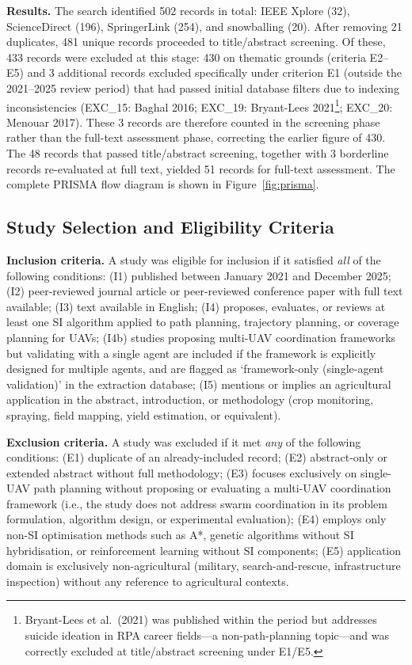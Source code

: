 \documentclass[review,3p,times]{elsarticle}
\begin{document}
\textbf{Results.} The search identified 502 records in total: IEEE Xplore (32), ScienceDirect (196), SpringerLink (254), and snowballing (20). After removing 21 duplicates, 481 unique records proceeded to title/abstract screening. Of these, 433 records were excluded at this stage: 430 on thematic grounds (criteria E2--E5) and 3 additional records excluded specifically under criterion E1 (outside the 2021--2025 review period) that had passed initial database filters due to indexing inconsistencies (EXC\_15: Baghal 2016; EXC\_19: Bryant-Lees 2021\footnote{Bryant-Lees et al.\ (2021) was published within the period but addresses suicide ideation in RPA career fields---a non-path-planning topic---and was correctly excluded at title/abstract screening under E1/E5.}; EXC\_20: Menouar 2017). These 3 records are therefore counted in the screening phase rather than the full-text assessment phase, correcting the earlier figure of 430. The 48 records that passed title/abstract screening, together with 3 borderline records re-evaluated at full text, yielded 51 records for full-text assessment. The complete PRISMA flow diagram is shown in Figure~\ref{fig:prisma}.

\subsection{Study Selection and Eligibility Criteria}

\textbf{Inclusion criteria.} A study was eligible for inclusion if it satisfied \textit{all} of the following conditions: (I1) published between January 2021 and December 2025; (I2) peer-reviewed journal article or peer-reviewed conference paper with full text available; (I3) text available in English; (I4) proposes, evaluates, or reviews at least one SI algorithm applied to path planning, trajectory planning, or coverage planning for UAVs; (I4b) studies proposing multi-UAV coordination frameworks but validating with a single agent are included if the framework is explicitly designed for multiple agents, and are flagged as `framework-only (single-agent validation)' in the extraction database; (I5) mentions or implies an agricultural application in the abstract, introduction, or methodology (crop monitoring, spraying, field mapping, yield estimation, or equivalent).

\textbf{Exclusion criteria.} A study was excluded if it met \textit{any} of the following conditions: (E1) duplicate of an already-included record; (E2) abstract-only or extended abstract without full methodology; (E3) focuses exclusively on single-UAV path planning without proposing or evaluating a multi-UAV coordination framework (i.e., the study does not address swarm coordination in its problem formulation, algorithm design, or experimental evaluation); (E4) employs only non-SI optimisation methods such as A*, genetic algorithms without SI hybridisation, or reinforcement learning without SI components; (E5) application domain is exclusively non-agricultural (military, search-and-rescue, infrastructure inspection) without any reference to agricultural contexts.
\end{document}
